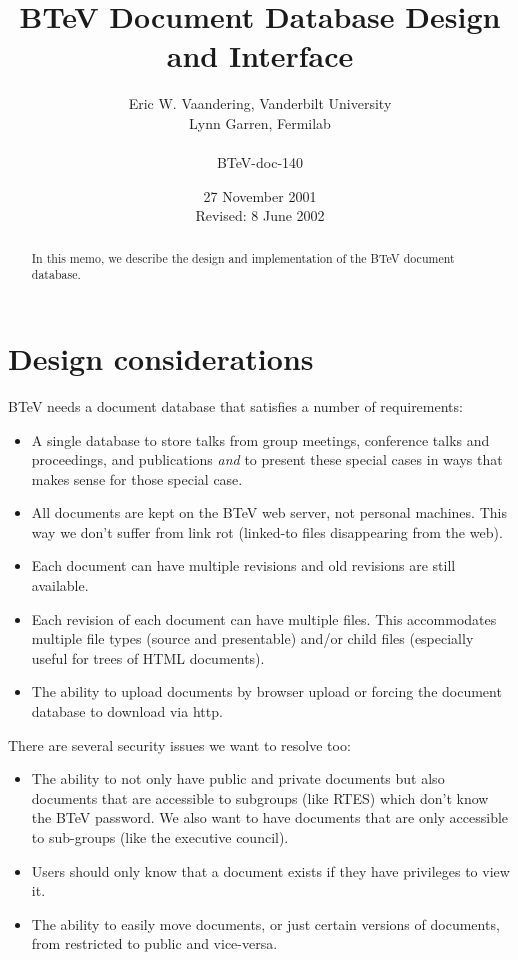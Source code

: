 \documentclass[12pt]{article}
\begin{document}
                                                 

\title{BTeV Document Database Design and Interface}

\author{
        Eric W. Vaandering, Vanderbilt University\\
        Lynn Garren, Fermilab\\
        \\
        {BTeV-doc-140}
       }
        

\date{27 November 2001 \\
      Revised: 8 June 2002}

\maketitle

\begin{abstract} 
In this memo, we describe the design and implementation of the BTeV document
database.
\end{abstract}

\section{Design considerations}

BTeV needs a document database that satisfies a number of requirements:
\begin{itemize}
\item{A single database to store talks from group meetings,
conference talks and proceedings, and publications \emph{and} to present these
special cases in ways that makes sense for those special case.}
\item{All documents are kept on the BTeV web server, not personal machines. 
This way we don't suffer from link rot (linked-to files disappearing from the web).}
\item{Each document can have multiple revisions and old revisions are still
available.}
\item{Each revision of each document can have multiple files. This accommodates
multiple file types (source and  presentable) and/or child files (especially
useful for trees of HTML  documents).}
\item{The ability to upload documents by browser upload or forcing the 
document database to download via http.}
\end{itemize}

There are several security issues we want to resolve too:
\begin{itemize}
\item{The ability to not only have public and private documents but also 
documents that are accessible to subgroups (like RTES) which don't know 
the BTeV password. We also want to have documents that are only 
accessible to sub-groups (like the executive council).}
\item{Users should only know that a document exists if they have 
privileges to view it.}
\item{The ability to easily move documents, or just certain versions of 
documents, from restricted to public and vice-versa.}
\end{itemize}
\end{document}
